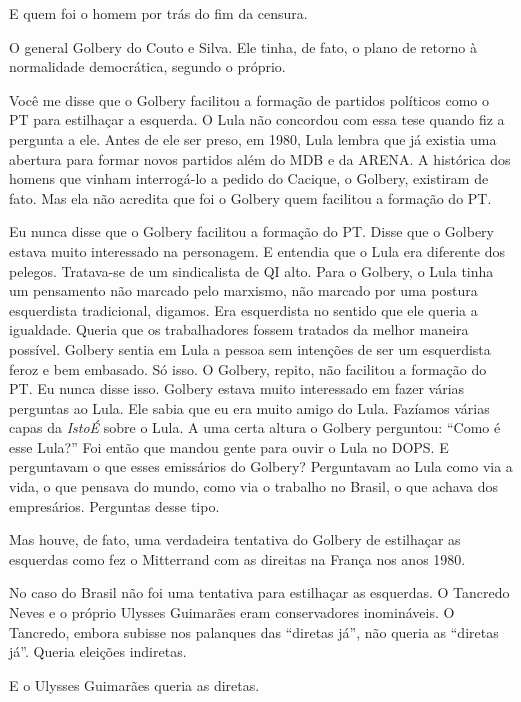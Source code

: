\falaG E quem foi o homem por trás do fim da censura.

\falaM O general Golbery do Couto e Silva. Ele tinha, de fato, o plano de
retorno à normalidade democrática, segundo o próprio.

\falaG Você me disse que o Golbery facilitou a formação de partidos
políticos como o PT para estilhaçar a esquerda. O Lula não concordou com
essa tese quando fiz a pergunta a ele. Antes de ele ser preso, em 1980,
Lula lembra que já existia uma abertura para formar novos partidos além
do MDB e da ARENA. A histórica dos homens que vinham interrogá-lo a
pedido do Cacique, o Golbery, existiram de fato. Mas ela não acredita
que foi o Golbery quem facilitou a formação do PT.

\falaM Eu nunca disse que o Golbery facilitou a formação do PT. Disse que o
Golbery estava muito interessado na personagem. E entendia que o Lula
era diferente dos pelegos. Tratava-se de um sindicalista de QI alto.
Para o Golbery, o Lula tinha um pensamento não marcado pelo marxismo,
não marcado por uma postura esquerdista tradicional, digamos. Era
esquerdista no sentido que ele queria a igualdade. Queria que os
trabalhadores fossem tratados da melhor maneira possível. Golbery sentia
em Lula a pessoa sem intenções de ser um esquerdista feroz e bem
embasado. Só isso. O Golbery, repito, não facilitou a formação do PT. Eu
nunca disse isso. Golbery estava muito interessado em fazer várias
perguntas ao Lula. Ele sabia que eu era muito amigo do Lula. Fazíamos
várias capas da \emph{IstoÉ} sobre o Lula. A uma certa altura o Golbery
perguntou: ``Como é esse Lula?'' Foi então que mandou gente para ouvir o
Lula no DOPS. E perguntavam o que esses emissários do Golbery?
Perguntavam ao Lula como via a vida, o que pensava do mundo, como via o
trabalho no Brasil, o que achava dos empresários. Perguntas desse tipo.

\falaG Mas houve, de fato, uma verdadeira tentativa do Golbery de estilhaçar
as esquerdas como fez o Mitterrand com as direitas na França nos anos
1980.

\falaM No caso do Brasil não foi uma tentativa para estilhaçar as esquerdas.
O Tancredo Neves e o próprio Ulysses Guimarães eram conservadores
inomináveis. O Tancredo, embora subisse nos palanques das ``diretas
já'', não queria as ``diretas já''. Queria eleições indiretas.

\falaG E o Ulysses Guimarães queria as diretas.


